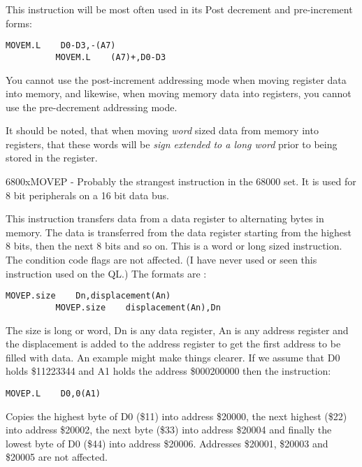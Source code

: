 This instruction will be most often used in its Post decrement and
    pre-{}increment forms:

\begin{lstlisting}[firstnumber=1,]
          MOVEM.L    D0-D3,-(A7) 
          MOVEM.L    (A7)+,D0-D3
\end{lstlisting}

You cannot use the post-increment addressing mode when moving register data into memory, and likewise, when moving memory data into registers, you cannot use the pre-decrement addressing mode.

\begin{warning}
It should be noted, that when moving \emph{word} sized data from memory into registers, that these words will be \emph{sign extended to a long word} prior to being stored in the register.
\end{warning}


\mc6800x{MOVEP} -{} Probably the strangest instruction in the 68000 set. It is used for 8 bit peripherals on a 16 bit data bus.

This
    instruction transfers data from a data register to alternating bytes in
    memory. The data is transferred from the data register starting from the
    highest 8 bits, then the next 8 bits and so on. This is a word or long
    sized instruction. The condition code flags are not affected. (I have
    never used or seen this instruction used on the QL.) The formats are
   :

\begin{lstlisting}[firstnumber=1,]
          MOVEP.size    Dn,displacement(An)
          MOVEP.size    displacement(An),Dn
\end{lstlisting}

The size is long or word, Dn is any data register, An is any address
    register and the displacement is added to the address register to get the
    first address to be filled with data. An example might make things
    clearer. If we assume that D0 holds \$11223344 and A1 holds the address
    \$000200000 then the instruction:

\begin{lstlisting}[firstnumber=1,]
          MOVEP.L    D0,0(A1)
\end{lstlisting}

Copies the highest byte of D0 (\$11) into address \$20000, the next
    highest (\$22) into address \$20002, the next byte (\$33) into address \$20004
    and finally the lowest byte of D0 (\$44) into address \$20006. Addresses
    \$20001, \$20003 and \$20005 are not affected.

